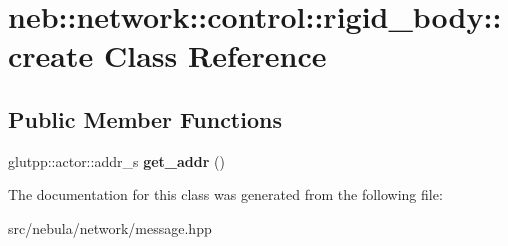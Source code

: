 \hypertarget{classneb_1_1network_1_1control_1_1rigid__body_1_1create}{\section{neb\-:\-:network\-:\-:control\-:\-:rigid\-\_\-body\-:\-:create \-Class \-Reference}
\label{classneb_1_1network_1_1control_1_1rigid__body_1_1create}
}
\subsection*{\-Public \-Member \-Functions}
\begin{DoxyCompactItemize}
\item 
\hypertarget{classneb_1_1network_1_1control_1_1rigid__body_1_1create_af3941f85f8c8499440492a4b4373231f}{glutpp\-::actor\-::addr\-\_\-s {\bfseries get\-\_\-addr} ()}\label{classneb_1_1network_1_1control_1_1rigid__body_1_1create_af3941f85f8c8499440492a4b4373231f}

\end{DoxyCompactItemize}


\-The documentation for this class was generated from the following file\-:\begin{DoxyCompactItemize}
\item 
src/nebula/network/message.\-hpp\end{DoxyCompactItemize}
